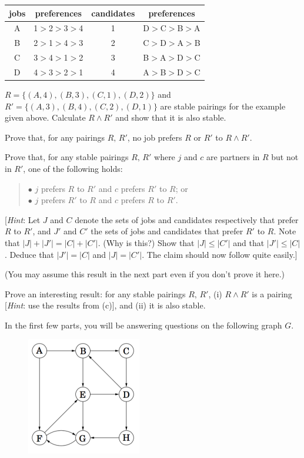 \documentclass[11pt]{article}
\begin{document}
\begin{center}
\begin{tabular}{|c|c||c|c|}\hline
jobs&preferences& candidates & preferences \\
\hline
A& 1$>$2$>$3$>$4& 1 & D$>$C$>$B$>$A \\
\hline
B&2$>$1$>$4$>$3 & 2 & C$>$D$>$A$>$B  \\
\hline
C&3$>$4$>$1$>$2 & 3 & B$>$A$>$D$>$C  \\
\hline
D&4$>$3$>$2$>$1 & 4 & A$>$B$>$D$>$C  \\
\hline
\end{tabular}
\end{center}

\begin{Parts}
\Part $R=\{(A,4),(B,3),(C,1),(D,2)\}$ and
$R'=\{(A,3),(B,4),(C,2),(D,1)\}$ are stable pairings for the
example given above. Calculate $R \land R'$
and show that it is also stable.

\Part Prove that, for any pairings $R,\,R'$,
no job prefers $R$ or $R'$ to $R \land R'$.

\Part  Prove that, for any stable pairings $R,\,R'$
where $j$ and $c$ are partners in $R$ but not in $R'$, one of the following
holds:
\begin{quote}
$\bullet$ $j$ prefers $R$ to $R'$ and $c$ prefers $R'$ to $R$; or\\
$\bullet$ $j$ prefers $R'$ to $R$ and $c$ prefers $R$ to $R'$.
\end{quote}
[\textit{Hint}: Let $J$ and $C$ denote the sets of jobs and candidates respectively
that prefer $R$ to $R'$, and $J'$ and $C'$ the sets of jobs and candidates that prefer $R'$ to $R$.  Note that $|J|+|J'|=|C|+|C'|$. (Why is this?) Show that $|J| \leq |C'|$ and that $|J'| \leq |C|$.  Deduce that $|J'|=|C|$ and $|J|=|C'|$.  The claim should now follow quite easily.]

(You may assume this result in the next part even if you don't prove it here.)

\Part Prove an interesting result: for any stable pairings $R,\,R'$, (i) $R \land R'$ is a pairing [\textit{Hint}: use the results from (c)], and (ii) it is also stable.

\end{Parts}


In the first few parts, you will be answering questions on the following graph $G$.

\begin{figure}[h]
\centering
\includegraphics[width=5cm]{simple_graph.png}
\end{figure}
\end{document}
